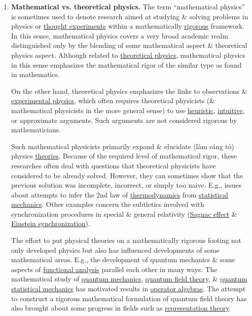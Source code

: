 \documentclass{article}
\begin{document}
\begin{enumerate}
	\item {\bf Mathematical vs. theoretical physics.} The term ``mathematical physics'' is sometimes used to denote research aimed at studying \& solving problems in physics or \href{https://en.wikipedia.org/wiki/Thought_experiment}{thought experiments} within a mathematically \href{https://en.wikipedia.org/wiki/Mathematical_rigour}{rigorous} framework. In this sense, mathematical physics covers a very broad academic realm distinguished only by the blending of some mathematical aspect \& theoretical physics aspect. Although related to \href{https://en.wikipedia.org/wiki/Theoretical_physics}{theoretical physics}, mathematical physics in this sense emphasizes the mathematical rigor of the similar type as found in mathematics.
	
	On the other hand, theoretical physics emphasizes the links to observations \& \href{https://en.wikipedia.org/wiki/Experimental_physics}{experimental physics}, which often requires theoretical physicists (\& mathematical physicists in the more general sense) to use \href{https://en.wikipedia.org/wiki/Heuristic}{heuristic}, \href{https://en.wikipedia.org/wiki/Intuition_(knowledge)}{intuitive}, or approximate arguments. Such arguments are not considered rigorous by mathematicians.
	
	Such mathematical physicists primarily expand \& elucidate (làm sáng tỏ) physics \href{https://en.wikipedia.org/wiki/Theories}{theories}. Because of the required level of mathematical rigor, these researches often deal with questions that theoretical physicists have considered to be already solved. However, they can sometimes show that the previous solution was incomplete, incorrect, or simply too naive. E.g., issues about attempts to infer the 2nd law of \href{https://en.wikipedia.org/wiki/Thermodynamics}{thermodynamics} from \href{https://en.wikipedia.org/wiki/Statistical_mechanics}{statistical mechanics}. Other examples concern the subtleties involved with synchronization procedures in special \& general relativity (\href{https://en.wikipedia.org/wiki/Sagnac_effect}{Sagnac effect} \& \href{https://en.wikipedia.org/wiki/Einstein_synchronisation}{Einstein synchronization}).
	
	The effort to put physical theories on a mathematically rigorous footing not only developed physics but also has influenced developments of some mathematical areas. E.g., the development of quantum mechanics \& some aspects of \href{https://en.wikipedia.org/wiki/Functional_analysis}{functional analysis} parallel each other in many ways. The mathematical study of \href{https://en.wikipedia.org/wiki/Quantum_mechanics}{quantum mechanics}, \href{https://en.wikipedia.org/wiki/Quantum_field_theory}{quantum field theory}, \& \href{https://en.wikipedia.org/wiki/Quantum_statistical_mechanics}{quantum statistical mechanics} has motivated results in \href{https://en.wikipedia.org/wiki/Operator_algebra}{operator algebras}. The attempt to construct a rigorous mathematical formulation of quantum field theory has also brought about some progress in fields such as \href{https://en.wikipedia.org/wiki/Representation_theory}{representation theory}.
\end{enumerate}
\end{document}

